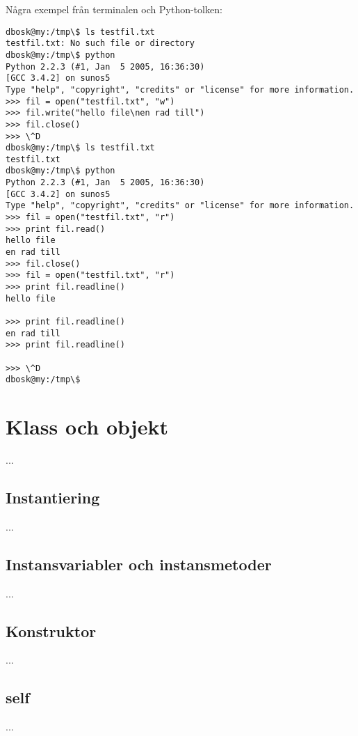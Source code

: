 Några exempel från terminalen och Python-tolken:
\begin{lstlisting}[style=text]
dbosk@my:/tmp\$ ls testfil.txt
testfil.txt: No such file or directory
dbosk@my:/tmp\$ python
Python 2.2.3 (#1, Jan  5 2005, 16:36:30)
[GCC 3.4.2] on sunos5
Type "help", "copyright", "credits" or "license" for more information.
>>> fil = open("testfil.txt", "w")
>>> fil.write("hello file\nen rad till")
>>> fil.close()
>>> \^D
dbosk@my:/tmp\$ ls testfil.txt
testfil.txt
dbosk@my:/tmp\$ python
Python 2.2.3 (#1, Jan  5 2005, 16:36:30)
[GCC 3.4.2] on sunos5
Type "help", "copyright", "credits" or "license" for more information.
>>> fil = open("testfil.txt", "r")
>>> print fil.read()
hello file
en rad till
>>> fil.close()
>>> fil = open("testfil.txt", "r")
>>> print fil.readline()
hello file

>>> print fil.readline()
en rad till
>>> print fil.readline()

>>> \^D
dbosk@my:/tmp\$ 
\end{lstlisting}



\section{Klass och objekt}

...


\subsection{Instantiering}

...


\subsection{Instansvariabler och instansmetoder}

...


\subsection{Konstruktor}

...


\subsection{self}

...


